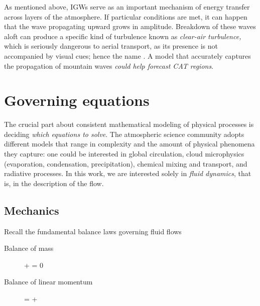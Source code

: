 \documentclass[../main.tex]{subfiles}
\begin{document}
As mentioned above, IGWs serve as an important mechanism of energy transfer across layers of the atmosphere. If particular conditions are met, it can happen that the wave propagating upward grows in amplitude. Breakdown of these waves aloft can produce a specific kind of turbulence known as \emph{clear-air turbulence,} which is seriously dangerous to aerial transport, as its presence is not accompanied by visual cues; hence the name \autocite[p.~58]{nappoIntroductionAtmosphericGravity2013}. A model that accurately captures the propagation of mountain waves \emph{could help forecast CAT regions}. 


\section{Governing equations}
\label{sec:GOV-EQUATIONS}

The crucial part about consistent mathematical modeling of physical processes is deciding \emph{which equations to solve}. The atmospheric science community adopts different models that range in complexity and the amount of physical phenomena they capture: one could be interested in \viz global circulation, cloud microphysics (evaporation, condensation, precipitation), chemical mixing and transport, and radiative processes. In this work, we are interested solely in \emph{fluid dynamics}, that is, in the description of the flow.

\subsection{Mechanics}
\label{sec:MECHANICS}

Recall the fundamental balance laws governing fluid flows

\begin{description}
	\item[Balance of mass]\mbox{}
	\begin{equations}[single,!,numberline=all]
	\label{eq:MASS-BALANCE}
	\tdot{\rho} + \rho \div {} = 0 \eqcomma
	\end{equations}
	\item[Balance of linear momentum]\mbox{}
	\begin{equations}[single,!,numberline=all]
	\label{eq:MOMENTUM-BALANCE}
	\rho {} = \div \cstress + \rho {} \eqend
	\end{equations}
\end{description}
\end{document}
